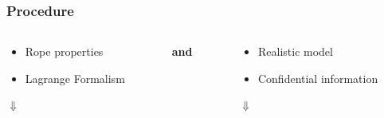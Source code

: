 \begin{frame}
    \frametitle{Procedure}
    \begin{columns}[onlytextwidth]
        \begin{column}{0.4\textwidth}
            \begin{block}{}
                \begin{itemize}
                    \item{Rope properties}
                    \item{Lagrange Formalism}
                \end{itemize}
            \end{block}
            
            \centering
            $\Downarrow$

            
            \begin{block}{}
            \end{block}
        \end{column}
        
        
        \begin{column}{0.065\textwidth}
        \textbf{and}
        \end{column}
        
        \begin{column}{0.4\textwidth}
            \begin{exampleblock}{}
                \begin{itemize}
                    \item{Realistic model}
                    \item{Confidential information}
                \end{itemize}
            \end{exampleblock}
            
            \centering
            $\Downarrow$
            
            \begin{exampleblock}{}
            \end{exampleblock}
        \end{column}
    \end{columns}
\end{frame}





